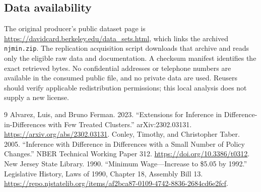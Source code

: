 \documentclass[11pt]{article}
\begin{document}
\subsection*{Data availability}
The original producer's public dataset page is \url{https://davidcard.berkeley.edu/data_sets.html}, which links the archived \texttt{njmin.zip}. The replication acquisition script downloads that archive and reads only the eligible raw data and documentation. A checksum manifest identifies the exact retrieved bytes. No confidential addresses or telephone numbers are available in the consumed public file, and no private data are used. Reusers should verify applicable redistribution permissions; this local analysis does not supply a new license. %

\begin{thebibliography}{9}
Alvarez, Luis, and Bruno Ferman. 2023.
``Extensions for Inference in Difference-in-Differences with Few Treated Clusters.''
arXiv:2302.03131. \url{https://arxiv.org/abs/2302.03131}.
Conley, Timothy, and Christopher Taber. 2005.
``Inference with Difference in Differences with a Small Number of Policy Changes.''
NBER Technical Working Paper 312. \url{https://doi.org/10.3386/t0312}.
New Jersey State Library. 1990.
``Minimum Wage---Increase to \$5.05 by 1992.''
Legislative History, Laws of 1990, Chapter 18, Assembly Bill 13.
\url{https://repo.njstatelib.org/items/af2bca87-0109-4742-8836-2684cd6e2fcf}.
\end{thebibliography}
\end{document}
